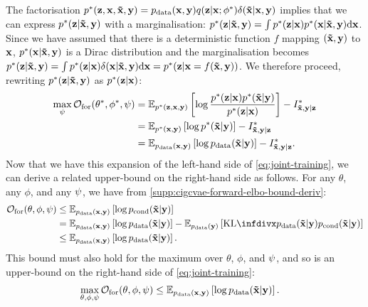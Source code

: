 The factorisation ${p}^*(\mathbf{z}{}, \mathbf{x}{}, \mathbf{\tilde{x}}{}, \mathbf{y}{}) = p_{\rm{data}}{}(\mathbf{x}{},
\mathbf{y}{}) q(\mathbf{z}{}|\mathbf{x}{}; {\phi}^*)\delta(\mathbf{\tilde{x}}{}|\mathbf{x}{},\mathbf{y}{})$ implies that
we can express ${p}^*{}(\mathbf{z}{}|\mathbf{\tilde{x}}{},\mathbf{y}{})$ with a marginalisation:
${p}^*{}(\mathbf{z}{}|\mathbf{\tilde{x}}{},\mathbf{y}{})=\int {p}^*{}(\mathbf{z}{}|\mathbf{x}{})
{p}^*{}(\mathbf{x}{}|\mathbf{\tilde{x}}{},\mathbf{y}{}) \mathrm{d}\mathbf{x}{}$. Since we have assumed that
there is a deterministic function $f$ mapping $(\mathbf{\tilde{x}}{},\mathbf{y}{})$ to $\mathbf{x}{}$,
${p}^*{}(\mathbf{x}{}|\mathbf{\tilde{x}}{},\mathbf{y}{})$ is a Dirac distribution and the
marginalisation becomes ${p}^*{}(\mathbf{z}{}|\mathbf{\tilde{x}}{},\mathbf{y}{}) = \int {p}^*{}(\mathbf{z}{}|\mathbf{x}{})
\delta(\mathbf{x}{}|\mathbf{\tilde{x}}{},\mathbf{y}{}) \mathrm{d}\mathbf{x}{} =
{p}^*{}(\mathbf{z}{}|\mathbf{x}{}=f(\mathbf{\tilde{x}}{},\mathbf{y}{}))$. We therefore proceed, rewriting
${p}^*{}(\mathbf{z}{}|\mathbf{\tilde{x}}{},\mathbf{y}{})$ as ${p}^*{}(\mathbf{z}{}|\mathbf{x}{})$:
\begin{align}
  \max_{\psi{}} \mathcal{O}_\mathrm{for}({\theta}^*, {\phi}^*, \psi{}) &= \mathbb{E}_{{p}^*{}(\mathbf{z}{},\mathbf{x}{},\mathbf{y}{})} \left[ \log \frac{{p}^*{}(\mathbf{z}{}|\mathbf{x}{}){p}^*{}(\mathbf{\tilde{x}}{}|\mathbf{y}{})}{{p}^*(\mathbf{z}{}|\mathbf{x}{})} \right] - I^*_{\mathbf{\tilde{x}}{},\mathbf{y}{}|\mathbf{z}{}}{} \label{eq:post-mapping}\\
                                                                                           &= \mathbb{E}_{{p}^*{}(\mathbf{x}{},\mathbf{y}{})} \left[ \log {p}^*{} (\mathbf{\tilde{x}}{}|\mathbf{y}{}) \right] - I^*_{\mathbf{\tilde{x}}{},\mathbf{y}{}|\mathbf{z}{}}{}\\
                                                                                           &= \mathbb{E}_{p_{\rm{data}}{}(\mathbf{x}{},\mathbf{y}{})} \left[ \log p_{\rm{data}}{} (\mathbf{\tilde{x}}{}|\mathbf{y}{}) \right] - I^*_{\mathbf{\tilde{x}}{},\mathbf{y}{}|\mathbf{z}{}}{}. \label{eq:max-partphi-bound}
\end{align}
Now that we have this expansion of the left-hand side of
\cref{eq:joint-training}, we can derive a related upper-bound on the right-hand
side as follows. For any $\theta$, any $\phi$, and any $\psi$, we have
from \cref{supp:cigcvae-forward-elbo-bound-deriv}:
\begin{align}
  \mathcal{O}_\mathrm{for}(\theta, \phi, \partphi{}) &\leq \EX_{\pdata{}(\I{},\partI{})} \left[ \log \pcomp{}(\tildeI{}|\partI{}) \right] \\
                                                     &= \EX_{\pdata{}(\I{},\partI{})} \left[ \log \pdata{}(\tildeI{}|\partI{}) \right] - \EX_{\pdata{}(\partI{})}\left[ \kl{\pdata{}(\tildeI{}|\partI{})}{\pcomp{}(\tildeI{}|\partI{})} \right] \\
                                                     &\leq \EX_{\pdata{}(\I{},\partI{})} \left[ \log \pdata{}(\tildeI{}|\partI{}) \right].
\end{align}
This bound must also hold for the maximum over $\theta$, $\phi$, and
$\psi$, and so is an upper-bound on the right-hand side of \cref{eq:joint-training}:
\begin{align}
  \max_{\theta, \phi, \psi{}} \mathcal{O}_\mathrm{for}(\theta, \phi, \psi{}) &\leq \mathbb{E}_{p_{\rm{data}}{}(\mathbf{x}{},\mathbf{y}{})} \left[ \log p_{\rm{data}}{}(\mathbf{\tilde{x}}{}|\mathbf{y}{}) \right]. \label{eq:max-all-bound}
\end{align}

